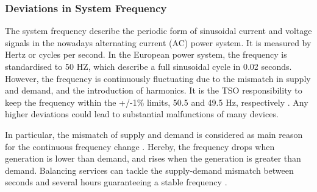 \documentclass[energies,article,submit,moreauthors,pdftex]{Definitions/mdpi}
\begin{document}



\subsubsection{Deviations in  System Frequency}

The system frequency describe the periodic form of sinusoidal current and voltage signals in the nowadays alternating current (AC) power system. It is measured by Hertz or cycles per second. In the European power system, the frequency is standardised to 50 HZ, which describe a full sinusoidal cycle in 0.02 seconds. However, the frequency is continuously fluctuating due to the mismatch in supply and demand, and the introduction of harmonics. It is the TSO responsibility to keep the frequency within the +/-1\% limits, 50.5 and 49.5 Hz, respectively \cite{ELEXON2020ELEXONBMRS}. Any higher deviations could lead to substantial malfunctions of many devices.

In particular, the mismatch of supply and demand is considered as main reason for the continuous frequency change \cite{ELEXON2020ELEXONBMRS}. Hereby, the frequency drops when generation is lower than demand, and rises when the generation is greater than demand. Balancing services can tackle the supply-demand mismatch between seconds and several hours guaranteeing a stable frequency \cite{Nationalgrid2018BalancingStatement}. 
\end{document}
